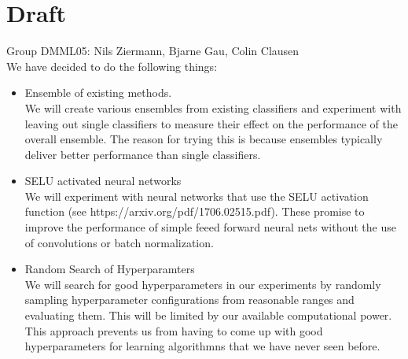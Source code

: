 \documentclass{article}
\begin{document}
\section*{Draft}
Group DMML05: Nils Ziermann, Bjarne Gau, Colin Clausen
\\
We have decided to do the following things:
\\

\begin{itemize}
\item Ensemble of existing methods.
\\
We will create various ensembles from existing classifiers and experiment with leaving out 
single classifiers to measure their effect on the performance of the overall ensemble.
The reason for trying this is because ensembles typically deliver better performance than single classifiers.

\item SELU activated neural networks
\\
We will experiment with neural networks that use the SELU activation function (see https://arxiv.org/pdf/1706.02515.pdf). These promise to improve the performance of simple feeed forward neural nets without the use of convolutions or batch normalization.

\item Random Search of Hyperparamters
\\
We will search for good hyperparameters in our experiments by randomly sampling hyperparameter configurations from reasonable ranges and evaluating them. This will be limited by our available computational power. This approach prevents us from having to come up with good hyperparameters for learning algorithmns that we have never seen before.

\end{itemize}
\end{document}
